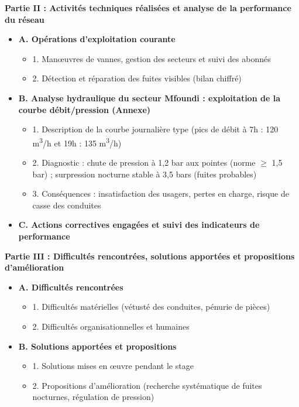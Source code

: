 \documentclass[11pt]{article}
\begin{document}
\begin{corrige}
\textbf{Partie II : Activités techniques réalisées et analyse de la performance du réseau}
\begin{itemize}
    \item \textbf{A. Opérations d'exploitation courante}
        \begin{itemize}
            \item 1. Manœuvres de vannes, gestion des secteurs et suivi des abonnés
            \item 2. Détection et réparation des fuites visibles (bilan chiffré)
        \end{itemize}
    \item \textbf{B. Analyse hydraulique du secteur Mfoundi : exploitation de la courbe débit/pression (Annexe)}
        \begin{itemize}
            \item 1. Description de la courbe journalière type (pics de débit à 7h : 120 m\textsuperscript{3}/h et 19h : 135 m\textsuperscript{3}/h)
            \item 2. Diagnostic : chute de pression à 1,2 bar aux pointes (norme $\geq$ 1,5 bar) ; surpression nocturne stable à 3,5 bars (fuites probables)
            \item 3. Conséquences : insatisfaction des usagers, pertes en charge, risque de casse des conduites
        \end{itemize}
    \item \textbf{C. Actions correctives engagées et suivi des indicateurs de performance}
\end{itemize}

\textbf{Partie III : Difficultés rencontrées, solutions apportées et propositions d'amélioration}
\begin{itemize}
    \item \textbf{A. Difficultés rencontrées}
        \begin{itemize}
            \item 1. Difficultés matérielles (vétusté des conduites, pénurie de pièces)
            \item 2. Difficultés organisationnelles et humaines
        \end{itemize}
    \item \textbf{B. Solutions apportées et propositions}
        \begin{itemize}
            \item 1. Solutions mises en œuvre pendant le stage
            \item 2. Propositions d'amélioration (recherche systématique de fuites nocturnes, régulation de pression)
        \end{itemize}
\end{itemize}


\end{corrige}
\end{document}
